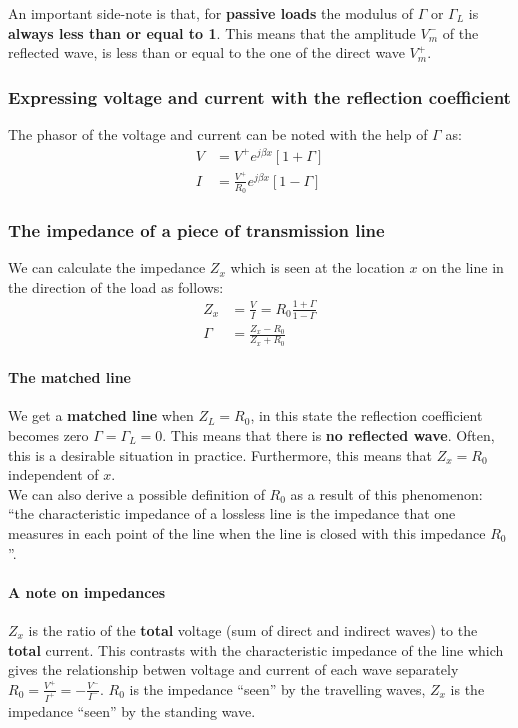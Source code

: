 \documentclass[../transmission.tex]{subfiles}
\begin{document}
				An important side-note is that, for \textbf{passive loads} the modulus of $\Gamma$ or $\Gamma_L$ is \textbf{always less than or equal to 1}. This means that the amplitude $V_m^-$ of the reflected wave, is less than or equal to the one of the direct wave $V_m^+$.
				
			\subsubsection{Expressing voltage and current with the reflection coefficient}
				The phasor of the voltage and current can be noted with the help of $\Gamma$ as:
				\begin{align}
					V&=V^+e^{j\beta x}[1+\Gamma]\\
					I&=\frac{V^+}{R_0}e^{j\beta x}[1-\Gamma]
				\end{align}
			
			\subsubsection{The impedance of a piece of transmission line}
				We can calculate the impedance $Z_x$ which is seen at the location $x$ on the line in the direction of the load as follows:
				\begin{align}
					Z_x &= \frac{V}{I} = R_0\frac{1+\Gamma}{1-\Gamma}\\
					\Gamma&=\frac{Z_x-R_0}{Z_x+R_0}
				\end{align}
				
				\paragraph{The matched line}
					We get a \textbf{matched line} when $Z_L = R_0$, in this state the reflection coefficient becomes zero $\Gamma = \Gamma_L=0$. This means that there is \textbf{no reflected wave}. Often, this is a desirable situation in practice. Furthermore, this means that $Z_x = R_0$ independent of $x$.\\
					
					We can also derive a possible definition of $R_0$ as a result of this phenomenon: ``the characteristic impedance of a lossless line is the impedance that one measures in each point of the line when the line is closed with this impedance $R_0$''.
				
				\paragraph{A note on impedances}
					$Z_x$ is the ratio  of the \textbf{total} voltage (sum of direct and indirect waves) to the \textbf{total} current. This contrasts with the characteristic impedance of the line which gives the relationship betwen voltage and current of each wave  separately $R_0 = \frac{V^+}{I^+} = -\frac{V^-}{I^-}$. $R_0$ is the impedance ``seen'' by the travelling waves,  $Z_x$ is the impedance ``seen'' by the standing wave. 
			
\end{document}
